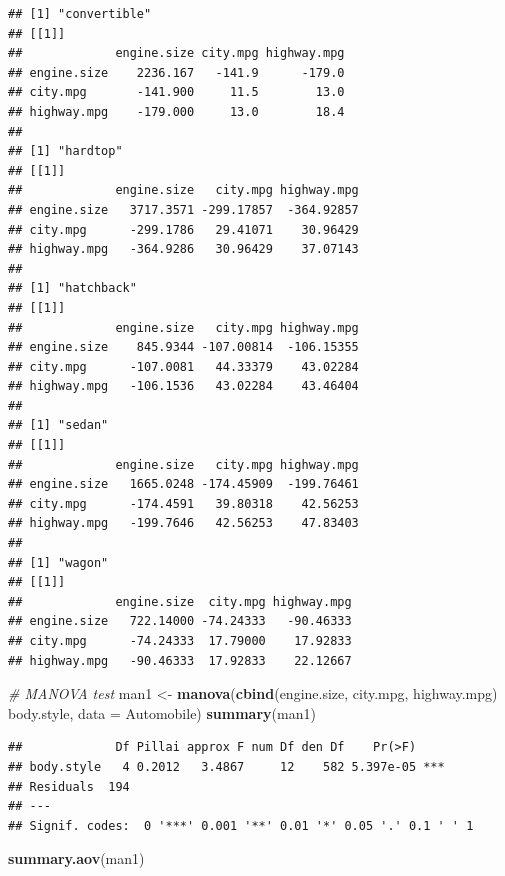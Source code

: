 \documentclass[]{article}
\newenvironment{Shaded}{\begin{snugshade}}{\end{snugshade}}
\newcommand{\KeywordTok}[1]{\textcolor[rgb]{0.13,0.29,0.53}{\textbf{#1}}}
\newcommand{\DataTypeTok}[1]{\textcolor[rgb]{0.13,0.29,0.53}{#1}}
\newcommand{\StringTok}[1]{\textcolor[rgb]{0.31,0.60,0.02}{#1}}
\newcommand{\CommentTok}[1]{\textcolor[rgb]{0.56,0.35,0.01}{\textit{#1}}}
\newcommand{\OperatorTok}[1]{\textcolor[rgb]{0.81,0.36,0.00}{\textbf{#1}}}
\newcommand{\NormalTok}[1]{#1}
\begin{document}
\begin{verbatim}
## [1] "convertible"
## [[1]]
##             engine.size city.mpg highway.mpg
## engine.size    2236.167   -141.9      -179.0
## city.mpg       -141.900     11.5        13.0
## highway.mpg    -179.000     13.0        18.4
## 
## [1] "hardtop"
## [[1]]
##             engine.size   city.mpg highway.mpg
## engine.size   3717.3571 -299.17857  -364.92857
## city.mpg      -299.1786   29.41071    30.96429
## highway.mpg   -364.9286   30.96429    37.07143
## 
## [1] "hatchback"
## [[1]]
##             engine.size   city.mpg highway.mpg
## engine.size    845.9344 -107.00814  -106.15355
## city.mpg      -107.0081   44.33379    43.02284
## highway.mpg   -106.1536   43.02284    43.46404
## 
## [1] "sedan"
## [[1]]
##             engine.size   city.mpg highway.mpg
## engine.size   1665.0248 -174.45909  -199.76461
## city.mpg      -174.4591   39.80318    42.56253
## highway.mpg   -199.7646   42.56253    47.83403
## 
## [1] "wagon"
## [[1]]
##             engine.size  city.mpg highway.mpg
## engine.size   722.14000 -74.24333   -90.46333
## city.mpg      -74.24333  17.79000    17.92833
## highway.mpg   -90.46333  17.92833    22.12667
\end{verbatim}

\begin{Shaded}
\begin{Highlighting}[]
\CommentTok{# MANOVA test}
\NormalTok{man1 <-}\StringTok{ }\KeywordTok{manova}\NormalTok{(}\KeywordTok{cbind}\NormalTok{(engine.size, city.mpg, highway.mpg) }\OperatorTok{~}\StringTok{ }\NormalTok{body.style, }
    \DataTypeTok{data =}\NormalTok{ Automobile)}
\KeywordTok{summary}\NormalTok{(man1)}
\end{Highlighting}
\end{Shaded}

\begin{verbatim}
##             Df Pillai approx F num Df den Df    Pr(>F)    
## body.style   4 0.2012   3.4867     12    582 5.397e-05 ***
## Residuals  194                                            
## ---
## Signif. codes:  0 '***' 0.001 '**' 0.01 '*' 0.05 '.' 0.1 ' ' 1
\end{verbatim}

\begin{Shaded}
\begin{Highlighting}[]
\KeywordTok{summary.aov}\NormalTok{(man1)}
\end{Highlighting}
\end{Shaded}
\end{document}
